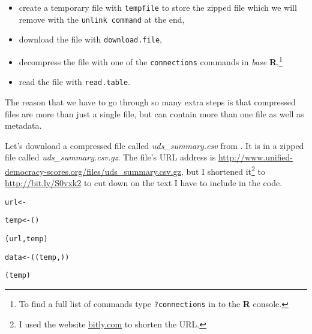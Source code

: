 {\begin{itemize}
    \item create a temporary file with {\tt{tempfile}} to store the zipped file which we will remove with the {\tt{unlink command}} at the end,
    \item download the file with {\tt{download.file}},
    \item decompress the file with one of the {\tt{connections}} commands in {\emph{base}} {\bf{R}},\footnote{To find a full list of commands type {\tt{?connections}} in to the {\bf{R}} console.}
    \item read the file with {\tt{read.table}}. 
\end{itemize}

The reason that we have to go through so many extra steps is that compressed files are more than just a single file, but can contain more than one file as well as metadata.

Let's download a compressed file called {\emph{uds\_summary.csv}} from \cite{Pemstein2010}. It is in a zipped file called {\emph{uds\_summary.csv.gz}}. The file's URL address is {\url{http://www.unified-democracy-scores.org/files/uds_summary.csv.gz}}, but I shortened it\footnote{I used the website \url{bitly.com} to shorten the URL.} to \url{http://bit.ly/S0vxk2} to cut down on the text I have to include in the code.

\begin{knitrout}
\color{fgcolor}\begin{kframe}
\begin{alltt}
url <- 

temp <- ()

(url, temp)

data <- ((temp, ))

(temp)
\end{alltt}
\end{kframe}
\end{knitrout}


}
